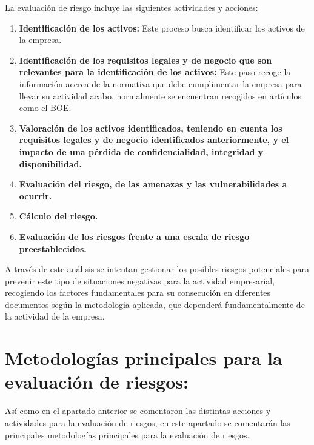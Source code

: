 La evaluación de riesgo incluye las siguientes actividades y acciones:
\begin{enumerate}
\item {\bfseries Identificación de los activos:}
Este proceso busca identificar los activos de la empresa.
\item {\bfseries Identificación de los requisitos legales y de negocio que son relevantes para la identificación de los activos:}
Este paso recoge la información acerca de la normativa que debe cumplimentar la empresa para llevar su actividad acabo, normalmente se encuentran recogidos en artículos como el BOE.
\item {\bfseries Valoración de los activos identificados, teniendo en cuenta los requisitos legales y de negocio identificados anteriormente, y el impacto de una pérdida de confidencialidad, integridad y disponibilidad.}
\item {\bfseries Evaluación del riesgo, de las amenazas y las vulnerabilidades a ocurrir.}
\item {\bfseries Cálculo del riesgo. }
\item {\bfseries Evaluación de los riesgos frente a una escala de riesgo preestablecidos.}
\end{enumerate}

A través de este análisis se intentan gestionar los posibles riesgos potenciales para prevenir este tipo de situaciones negativas para la actividad empresarial, recogiendo los factores fundamentales para su consecución en diferentes documentos según la metodología aplicada, que dependerá fundamentalmente de la actividad de la empresa.

\section{Metodologías principales para la evaluación de riesgos:}
Así como en el apartado anterior se comentaron las distintas acciones y actividades para la evaluación de riesgos, en este apartado se comentarán las principales metodologías principales para la evaluación de riesgos.

